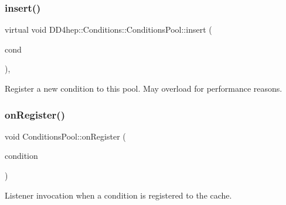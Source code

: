 \hypertarget{class_d_d4hep_1_1_conditions_1_1_conditions_pool_a0acc07312e725ef5fb80e0de276b501e}{}\label{class_d_d4hep_1_1_conditions_1_1_conditions_pool_a0acc07312e725ef5fb80e0de276b501e} 
\subsubsection{\texorpdfstring{insert()}{insert()}\hspace{0.1cm}{\footnotesize\ttfamily [2/2]}}
{\footnotesize\ttfamily virtual void D\+D4hep\+::\+Conditions\+::\+Conditions\+Pool\+::insert (\begin{DoxyParamCaption}\item[{\hyperlink{namespace_d_d4hep_1_1_conditions_ae765f0140a33973a430280f02b6062f4}{Range\+Conditions} \&}]{cond }\end{DoxyParamCaption})\hspace{0.3cm}{\ttfamily [protected]}, {}}



Register a new condition to this pool. May overload for performance reasons. 

\hypertarget{class_d_d4hep_1_1_conditions_1_1_conditions_pool_aac40c7730b4ef3cb08253c98a6d79ee2}{}\label{class_d_d4hep_1_1_conditions_1_1_conditions_pool_aac40c7730b4ef3cb08253c98a6d79ee2} 
\subsubsection{\texorpdfstring{on\+Register()}{onRegister()}}
{\footnotesize\ttfamily void Conditions\+Pool\+::on\+Register (\begin{DoxyParamCaption}\item[{\hyperlink{class_d_d4hep_1_1_conditions_1_1_condition}{Condition}}]{condition }\end{DoxyParamCaption})\hspace{0.3cm}{\ttfamily [protected]}}



Listener invocation when a condition is registered to the cache. 



